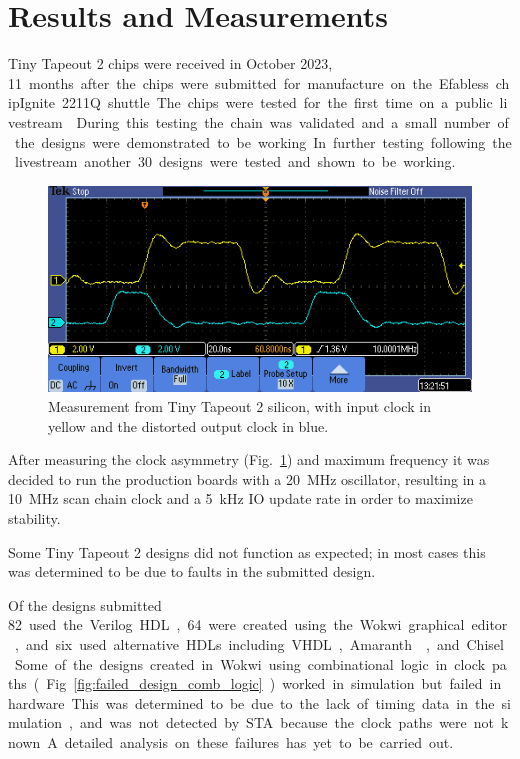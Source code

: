\section{Results and Measurements}
\label{sec:results}

Tiny Tapeout 2 chips were received in October 2023, \qty{11} months after the chips were submitted for manufacture on the Efabless chipIgnite 2211Q shuttle.
The chips were tested for the first time on a public livestream~\cite{siliconalive}.
During this testing the chain was validated and a small number of the designs were demonstrated to be working.
In further testing following the livestream another \qty{30} designs were tested and shown to be working.

\begin{figure}[!t]
\centering
\includegraphics[width=\columnwidth]{./Figs/tt02_clock_out.png}
\caption{Measurement from Tiny Tapeout 2 silicon, with input clock in yellow and the distorted output clock in blue.}
\label{fig:TT02_clock_out}
\end{figure}

After measuring the clock asymmetry (Fig.~\ref{fig:TT02_clock_out}) and maximum frequency it was decided to run the production boards with a \qty{20}{\MHz} oscillator, resulting in a \qty{10}{\MHz} scan chain clock and a \qty{5}{\kHz} IO update rate in order to maximize stability.

Some Tiny Tapeout 2 designs did not function as expected; in most cases this was determined to be due to faults in the submitted design.

Of the designs submitted \qty{82} used the Verilog HDL, \qty{64} were created using the Wokwi graphical editor, and six used alternative HDLs including VHDL, Amaranth~\cite{amaranth}, and Chisel~\cite{chisel}.

Some of the designs created in Wokwi using combinational logic in clock paths (Fig.~\ref{fig:failed_design_comb_logic}) worked in simulation but failed in hardware.
This was determined to be due to the lack of timing data in the simulation, and was not detected by STA because the clock paths were not known. A detailed analysis on these failures has yet to be carried out.

